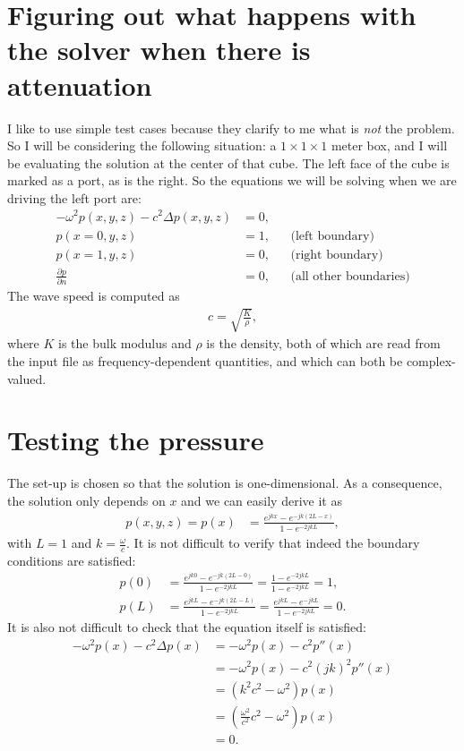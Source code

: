 \documentclass{article}
\begin{document}
\section*{Figuring out what happens with the solver
  \centering when there is attenuation}

I like to use simple test cases because they clarify to me what is
\textit{not} the problem. So I will be considering the following
situation: a $1\times 1\times 1$ meter box, and I will be evaluating
the solution at the center of that cube. The left face of the cube is
marked as a port, as is the right. So the equations we will be
solving when we are driving the left port are:
\begin{align*}
  -\omega^2 p(x,y,z) - c^2 \Delta p(x,y,z) &= 0, \\
  p(x=0,y,z) &= 1, && \text{(left boundary)}\\
  p(x=1,y,z) &= 0, && \text{(right boundary)} \\
    \frac{\partial p}{\partial n} &= 0,
     && \text{(all other boundaries)}
\end{align*}
The wave speed is computed as
\begin{align*}
  c = \sqrt{\frac{K}{\rho}},
\end{align*}
where $K$ is the bulk modulus and $\rho$ is the density, both of which
are read from the input file as frequency-dependent quantities, and
which can both be complex-valued.


\section{Testing the pressure}

The set-up is chosen so that the solution is one-dimensional. As a
consequence, the solution only depends on $x$ and we can easily derive
it as
\begin{align*}
  p(x,y,z) = p(x) &= \frac{e^{jkx} - e^{-jk(2L-x)}}{1 - e^{-2jkL}},
\end{align*}
with $L=1$ and $k=\frac{\omega}{c}$. It is not difficult to verify
that indeed the boundary conditions are satisfied:
\begin{align*}
  p(0) &= \frac{e^{jk0} - e^{-jk(2L-0)}}{1 - e^{-2jkL}}
  =
  \frac{1 - e^{-2jkL}}{1 - e^{-2jkL}} = 1,
  \\
  p(L) &= \frac{e^{jkL} - e^{-jk(2L-L)}}{1 - e^{-2jkL}}
  = \frac{e^{jkL} - e^{-jkL}}{1 - e^{-2jkL}} = 0.
\end{align*}
It is also not difficult to check that the equation itself is
satisfied:
\begin{align*}
  -\omega^2 p(x) - c^2 \Delta p(x)
  &= -\omega^2 p(x) - c^2 p''(x)\\
  &= -\omega^2 p(x) - c^2 (jk)^2 p''(x)  \\
  &= (k^2c^2-\omega^2) p(x) \\
  &= \left(\frac{\omega^2}{c^2}c^2-\omega^2\right) p(x)\\
  &= 0.
\end{align*}
\end{document}
